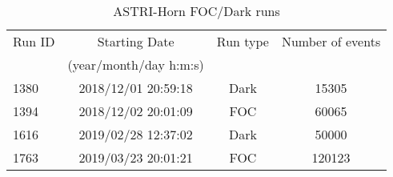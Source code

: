 \begin{table*}[htbp!!]
\centering
\caption{ASTRI-Horn FOC/Dark runs}
\label{table2}
\begin{tabular}{lccc}
\hline\hline
Run ID & Starting Date & Run type      & Number of events \\
               & (year/month/day h:m:s)   \\
\hline     
1380 & 2018/12/01 20:59:18  &   Dark    & 15305      \\
1394 & 2018/12/02 20:01:09  &   FOC     & 60065     \\
1616 & 2019/02/28 12:37:02  &   Dark    & 50000     \\
1763 & 2019/03/23 20:01:21  &   FOC     & 120123    \\
  

\hline\hline
\end{tabular}
\end{table*}
